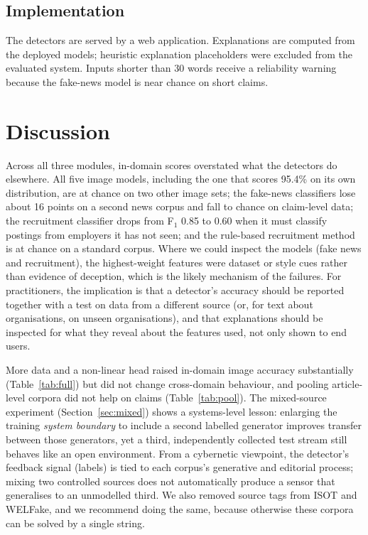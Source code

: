 \documentclass[11pt,a4paper]{article}
\begin{document}
\subsection{Implementation}
The detectors are served by a web application. Explanations are computed from the deployed models;
heuristic explanation placeholders were excluded from the evaluated system. Inputs shorter than 30
words receive a reliability warning because the fake-news model is near chance on short claims.

\section{Discussion}
Across all three modules, in-domain scores overstated what the detectors do elsewhere. All five image models, including the one that scores 95.4\% on its own distribution, are at chance on two other image sets; the fake-news classifiers lose about 16 points on a second news corpus and fall to chance on claim-level data; the recruitment classifier drops from F$_1$ 0.85 to 0.60 when it must classify postings from employers it has not seen; and the rule-based recruitment method is at chance on a standard corpus. Where we could inspect the models (fake news and recruitment), the highest-weight features were dataset or style cues rather than evidence of deception, which is the likely mechanism of the failures. For practitioners, the implication is that a detector's accuracy should be reported together with a test on data from a different source (or, for text about organisations, on unseen organisations), and that explanations should be inspected for what they reveal about the features used, not only shown to end users.

More data and a non-linear head raised in-domain image accuracy substantially (Table~\ref{tab:full}) but did not change cross-domain behaviour, and pooling article-level corpora did not help on claims (Table~\ref{tab:pool}). The mixed-source experiment (Section~\ref{sec:mixed}) shows a systems-level lesson: enlarging the training \emph{system boundary} to include a second labelled generator improves transfer between those generators, yet a third, independently collected test stream still behaves like an open environment. From a cybernetic viewpoint, the detector's feedback signal (labels) is tied to each corpus's generative and editorial process; mixing two controlled sources does not automatically produce a sensor that generalises to an unmodelled third. We also removed source tags from ISOT and WELFake, and we recommend doing the same, because otherwise these corpora can be solved by a single string.
\end{document}
